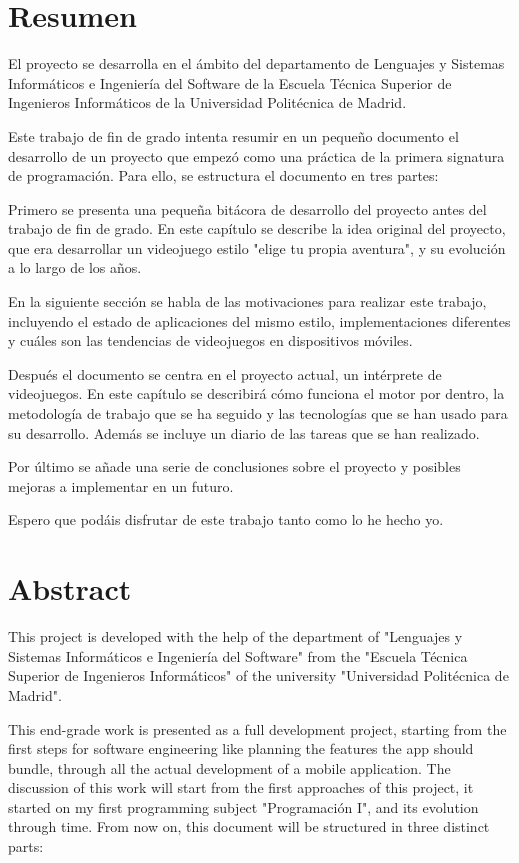 \chapter*{Resumen}

El proyecto se desarrolla en el ámbito del departamento de Lenguajes y Sistemas Informáticos e Ingeniería del Software de la Escuela Técnica Superior de Ingenieros Informáticos de la Universidad Politécnica de Madrid.

Este trabajo de fin de grado intenta resumir en un pequeño documento el desarrollo de un proyecto que empezó como una práctica de la primera signatura de programación.
Para ello, se estructura el documento en tres partes:

Primero se presenta una pequeña bitácora de desarrollo del proyecto antes del trabajo de fin de grado. En este capítulo se describe la idea original del proyecto, que era desarrollar un videojuego estilo "elige tu propia aventura", y su evolución a lo largo de los años.

En la siguiente sección se habla de las motivaciones para realizar este trabajo, incluyendo el estado de aplicaciones del mismo estilo, implementaciones diferentes y cuáles son las tendencias de videojuegos en dispositivos móviles.

Después el documento se centra en el proyecto actual, un intérprete de videojuegos. En este capítulo se describirá cómo funciona el motor por dentro, la metodología de trabajo que se ha seguido y las tecnologías que se han usado para su desarrollo. Además se incluye un diario de las tareas que se han realizado.

Por último se añade una serie de conclusiones sobre el proyecto y posibles mejoras a implementar en un futuro.

Espero que podáis disfrutar de este trabajo tanto como lo he hecho yo.

\newpage

\chapter*{Abstract}

This project is developed with the help of the department of "Lenguajes y Sistemas Informáticos e Ingeniería del Software" from the "Escuela Técnica Superior de Ingenieros Informáticos" of the university "Universidad Politécnica de Madrid".

This end-grade work is presented as a full development project, starting from the first steps for software engineering like planning the features the app should bundle, through all the actual development of a mobile application. The discussion of this work will start from the first approaches of this project, it started on my first programming subject "Programación I", and its evolution through time.
From now on, this document will be structured in three distinct parts:

